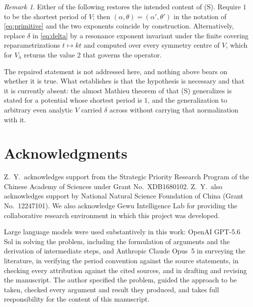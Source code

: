 \documentclass[11pt,reqno]{amsart}
\theoremstyle{plain}
\theoremstyle{definition}
\theoremstyle{remark}
\newtheorem{remark}[theorem]{Remark}
\numberwithin{equation}{section}
\begin{document}
\begin{remark}
  \label{rem:repairs}
  Either of the following restores the intended content of (S). Require $1$
  to be the shortest period of $V$; then $(\alpha,\theta)=(\alpha',\theta')$
  in the notation of \eqref{eq:primitive} and the two exponents coincide by
  construction. Alternatively, replace $\delta$ in \eqref{eq:delta} by a
  resonance exponent invariant under the finite covering reparametrizations
  $t\mapsto kt$ and computed over every symmetry centre of $V$, which for
  $V_\lambda$ returns the value $2$ that governs the operator.
\end{remark}

The repaired statement is not addressed here, and nothing above bears on
whether it is true. What  establishes is that the hypothesis
is necessary and that it is currently absent: the almost Mathieu theorem of
\cite{Jitomirskaya_2024ur,Jitomirskaya_2023od} that (S) generalizes is stated
for a potential whose shortest period is $1$, and the generalization to
arbitrary even analytic $V$ carried $\delta$ across without carrying that
normalization with it.

\section*{Acknowledgments}

Z.\ Y.\ acknowledges support from the Strategic Priority Research Program of the
Chinese Academy of Sciences under Grant No.~XDB1680102. Z.\ Y.\ also
acknowledges support by National Natural Science Foundation of China (Grant
No.~12247101). We also acknowledge Gewu Intelligence Lab for providing the
collaborative research environment in which this project was developed.

Large language models were used substantively in this work: OpenAI GPT-5.6 Sol
in solving the problem, including the formulation of arguments and the
derivation of intermediate steps, and Anthropic Claude Opus~5 in surveying the
literature, in verifying the period convention against the source statements,
in checking every attribution against the cited sources, and in drafting and
revising the manuscript. The author specified the problem,
guided the approach to be taken, checked every argument and result they
produced, and takes full responsibility for the content of this manuscript.



\end{document}
